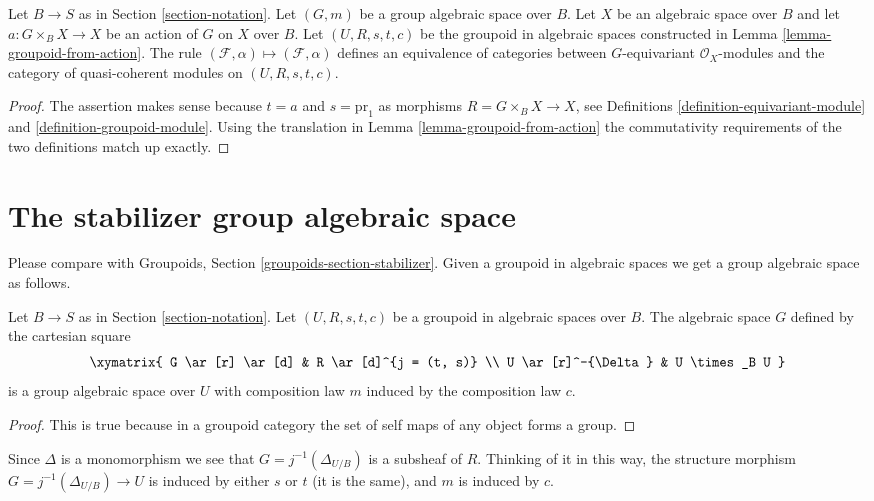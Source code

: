 \begin{lemma}
\label{lemma-action-groupoid-modules}
Let $B \to S$ as in Section \ref{section-notation}.
Let $(G, m)$ be a group algebraic space over $B$.
Let $X$ be an algebraic space over $B$ and let $a : G \times_B X \to X$
be an action of $G$ on $X$ over $B$. Let $(U, R, s, t, c)$ be
the groupoid in algebraic spaces constructed in
Lemma \ref{lemma-groupoid-from-action}.
The rule
$(\mathcal{F}, \alpha) \mapsto (\mathcal{F}, \alpha)$ defines
an equivalence of categories between $G$-equivariant
$\mathcal{O}_X$-modules and the category of quasi-coherent
modules on $(U, R, s, t, c)$.
\end{lemma}

\begin{proof}
The assertion makes sense because $t = a$ and $s = \text{pr}_1$
as morphisms $R = G \times_B X \to X$, see
Definitions \ref{definition-equivariant-module} and
\ref{definition-groupoid-module}.
Using the translation in Lemma \ref{lemma-groupoid-from-action}
the commutativity requirements
of the two definitions match up exactly.
\end{proof}





\section{The stabilizer group algebraic space}
\label{section-stabilizer}

\noindent
Please compare with
Groupoids, Section \ref{groupoids-section-stabilizer}.
Given a groupoid in algebraic spaces we get a group algebraic space as follows.

\begin{lemma}
\label{lemma-groupoid-stabilizer}
Let $B \to S$ as in Section \ref{section-notation}.
Let $(U, R, s, t, c)$ be a groupoid in algebraic spaces over $B$.
The algebraic space $G$ defined by the cartesian square
$$
\xymatrix{
G \ar[r] \ar[d] & R \ar[d]^{j = (t, s)} \\
U \ar[r]^-{\Delta} & U \times_B U
}
$$
is a group algebraic space over $U$ with composition law
$m$ induced by the composition law $c$.
\end{lemma}

\begin{proof}
This is true because in a groupoid category the
set of self maps of any object forms a group.
\end{proof}

\noindent
Since $\Delta$ is a monomorphism we see that $G = j^{-1}(\Delta_{U/B})$ is a
subsheaf of $R$. Thinking of it in this way, the structure morphism
$G = j^{-1}(\Delta_{U/B}) \to U$ is induced by either $s$ or $t$
(it is the same), and $m$ is induced by $c$.


